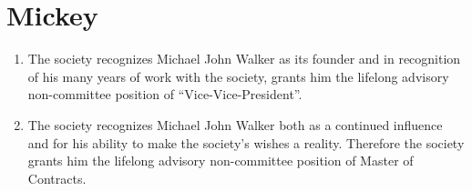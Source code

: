 \documentclass[a4paper,10pt]{article}
\begin{document}
\section{Mickey}
\begin{enumerate}
  \item The society recognizes Michael John Walker as its founder and in recognition of his many years of work with the society, grants him the lifelong advisory non-committee position of “Vice-Vice-President”.
  \item The society recognizes Michael John Walker both as a continued influence and for his ability to make the society's wishes a reality. Therefore the society grants him the lifelong advisory non-committee position of Master of Contracts.
\end{enumerate}
\end{document}
